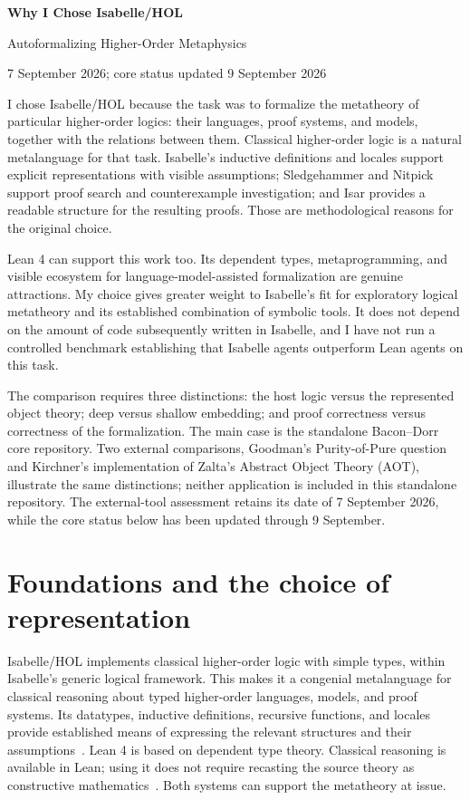 \documentclass[12pt,leqno]{article}
\begin{document}
\begin{center}
{\Large\bfseries Why I Chose Isabelle/HOL\par}
\vspace{4pt}
{\large Autoformalizing Higher-Order Metaphysics\par}
\vspace{8pt}
{\normalsize 7 September 2026; core status updated 9 September 2026}
\end{center}
\bigskip

\noindent I chose Isabelle/HOL because the task was to formalize the
metatheory of particular higher-order logics: their languages, proof systems,
and models, together with the relations between them. Classical higher-order
logic is a natural metalanguage for that task. Isabelle's inductive
definitions and locales support explicit representations with visible
assumptions; Sledgehammer and Nitpick support proof search and counterexample
investigation; and Isar provides a readable structure for the resulting
proofs. Those are methodological reasons for the original choice.

Lean 4 can support this work too. Its dependent types, metaprogramming, and
visible ecosystem for language-model-assisted formalization are genuine
attractions. My choice gives greater weight to Isabelle's fit for exploratory
logical metatheory and its established combination of symbolic tools.
It does not depend on the amount of code subsequently written in Isabelle,
and I have not run a controlled benchmark establishing that Isabelle agents
outperform Lean agents on this task.

The comparison requires three distinctions: the host logic versus the
represented object theory; deep versus shallow embedding; and proof
correctness versus correctness of the formalization. The main case is the
standalone Bacon--Dorr core repository. Two external comparisons,
Goodman's Purity-of-Pure question and Kirchner's implementation of Zalta's
Abstract Object Theory (AOT), illustrate the same distinctions; neither
application is included in this standalone repository. The external-tool
assessment retains its date of 7 September 2026, while the core status below
has been updated through 9 September.

\section{Foundations and the choice of representation}

Isabelle/HOL implements classical higher-order logic with simple types,
within Isabelle's generic logical framework. This makes it a congenial
metalanguage for classical reasoning about typed higher-order languages,
models, and proof systems. Its datatypes, inductive definitions, recursive
functions, and locales provide established means of expressing the relevant
structures and their assumptions~\cite{isabelle}. Lean 4 is based on dependent
type theory. Classical reasoning is available in Lean; using it does not
require recasting the source theory as constructive mathematics~\cite{lean-types}.
Both systems can support the metatheory at issue.
\end{document}
